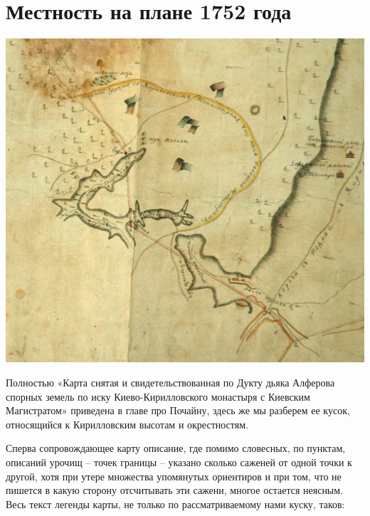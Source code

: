 \chapter{Местность на плане 1752 года}

\begin{center}
\includegraphics[width=\linewidth]{chast-kirvys/1752/1752y.jpg}
\end{center}

Полностью «Карта снятая и свидетельствованная по Дукту дьяка Алферова спорных земель по иску Киево-Кирилловского монастыря с Киевским Магистратом» приведена в главе про Почайну, здесь же мы разберем ее кусок, относящийся к Кирилловским высотам и окрестностям.

Сперва сопровождающее карту описание, где помимо словесных, по пунктам, описаний урочищ – точек границы – указано сколько саженей от одной точки к другой, хотя при утере множества упомянутых ориентиров и при том, что не пишется в какую сторону отсчитывать эти сажени, многое остается неясным. Весь текст легенды карты, не только по рассматриваемому нами куску, таков:

